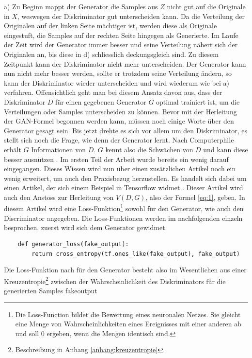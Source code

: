 a) Zu Beginn mappt der Generator die Samples aus $Z$ nicht gut auf die Originale in $X$, weswegen der Diskriminator gut
unterscheiden kann. Da die Verteilung der Originalen auf der linken Seite mächtiger ist, werden diese
als Originale eingestuft, die Samples auf der rechten Seite hingegen als Generierte. Im Laufe der Zeit wird
der Generator immer besser und seine Verteilung nähert sich der Originalen an, bis diese in
d) schliesslich deckungsgleich sind. Zu diesem Zeitpunkt kann der Diskriminator nicht mehr unterscheiden. Der Generator kann
nun nicht mehr besser werden, sollte er trotzdem seine Verteilung ändern, so kann der Diskriminator
wieder unterscheiden und wird wiederum wie bei a) verfahren. Offensichtlich geht man bei diesem Ansatz davon aus, dass der
Diskriminator $D$ für einen gegebenen Generator $G$ optimal trainiert ist, um die Verteilungen oder Samples unterscheiden
zu können.
\para
Bevor mit der Herleitung der GAN-Formel begonnen werden kann, müssen noch einige Worte über den Generator gesagt sein.
Bis jetzt drehte es sich vor allem um den Diskriminator, es stellt sich noch die Frage, wie denn der Generator lernt.
Nach \glqq Computerphile\grqq{} erhält $G$ Informationen von $D$.
$G$ kennt also die Schwächen von $D$ und kann diese besser ausnützen \cite{youtube:gan}. Im ersten Teil der Arbeit wurde
bereits ein wenig darauf eingegangen. Dieses Wissen wird nun über einen zusätzlichen Artikel noch ein wenig erweitert, um
auch den Praxisbezug herzustellen. Es handelt sich dabei um einen Artikel, der sich einem Beispiel in Tensorflow widmet \cite{tensorflow:1:gan}.
Dieser Artikel wird auch den Anstoss zur Herleitung von $V(D,G)$, also der Formel \ref{eq:1}, geben.
In diesem Artikel wird eine Loss-Funktion\footnote{Die Loss-Function bildet die Bewertung eines neuronalen Netzes. Sie gleicht eine Menge von Wahrscheinlichkeiten eines
Ereignisses mit einer anderen ab und soll $0$ ergeben, wenn die Mengen identisch sind.\cite{wiki:lossFunction}}
sowohl für den Generator, wie auch den Discriminator angegeben. Die Loss-Funktionen werden im nachfolgenden einzeln besprochen, zuerst wird sich dem Generator gewidmet.
\begin{lstlisting}
    def generator_loss(fake_output):
        return cross_entropy(tf.ones_like(fake_output), fake_output)
\end{lstlisting}
Die Loss-Funktion nach \cite{tensorflow:1:gan} für den Generator besteht also im Wesentlichen aus einer Kreuzentropie\footnote{Beschreibung in
Anhang \ref{anhang:kreuzentropie}} zwischen der Wahrscheinlichkeit des Diskriminators für die generierten Samples \glqq fake\textunderscore output\grqq{}

